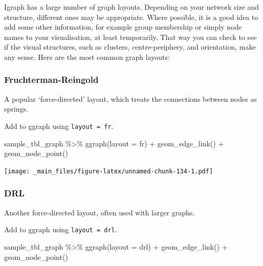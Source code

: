 \documentclass[
]{book}
\newenvironment{Shaded}{\begin{snugshade}}{\end{snugshade}}
\newcommand{\AttributeTok}[1]{\textcolor[rgb]{0.77,0.63,0.00}{#1}}
\newcommand{\FunctionTok}[1]{\textcolor[rgb]{0.00,0.00,0.00}{#1}}
\newcommand{\NormalTok}[1]{#1}
\newcommand{\SpecialCharTok}[1]{\textcolor[rgb]{0.00,0.00,0.00}{#1}}
\newcommand{\StringTok}[1]{\textcolor[rgb]{0.31,0.60,0.02}{#1}}
\begin{document}
Igraph has a large number of graph layouts. Depending on your network size and structure, different ones may be appropriate. Where possible, it is a good idea to add some other information, for example group membership or simply node names to your visualisation, at least temporarily. That way you can check to see if the visual structures, such as clusters, centre-periphery, and orientation, make any sense. Here are the most common graph layouts:

\hypertarget{fruchterman-reingold}{%
\subsubsection{Fruchterman-Reingold}\label{fruchterman-reingold}}

A popular `force-directed' layout, which treats the connections between nodes as springs.

Add to ggraph using \texttt{layout\ =\ \textquotesingle{}fr\textquotesingle{}}.

\begin{Shaded}
\begin{Highlighting}[]
\NormalTok{sample\_tbl\_graph }\SpecialCharTok{\%\textgreater{}\%} 
  \FunctionTok{ggraph}\NormalTok{(}\AttributeTok{layout =} \StringTok{\textquotesingle{}fr\textquotesingle{}}\NormalTok{) }\SpecialCharTok{+} 
  \FunctionTok{geom\_edge\_link}\NormalTok{() }\SpecialCharTok{+} 
  \FunctionTok{geom\_node\_point}\NormalTok{()}
\end{Highlighting}
\end{Shaded}

\texttt{[image: \_main\_files/figure-latex/unnamed-chunk-134-1.pdf]}

\hypertarget{drl}{%
\subsubsection{DRL}\label{drl}}

Another force-directed layout, often used with larger graphs.

Add to ggraph using \texttt{layout\ =\ \textquotesingle{}drl\textquotesingle{}}.

\begin{Shaded}
\begin{Highlighting}[]
\NormalTok{sample\_tbl\_graph }\SpecialCharTok{\%\textgreater{}\%} 
  \FunctionTok{ggraph}\NormalTok{(}\AttributeTok{layout =} \StringTok{\textquotesingle{}drl\textquotesingle{}}\NormalTok{) }\SpecialCharTok{+} 
  \FunctionTok{geom\_edge\_link}\NormalTok{() }\SpecialCharTok{+} 
  \FunctionTok{geom\_node\_point}\NormalTok{()}
\end{Highlighting}
\end{Shaded}
\end{document}

